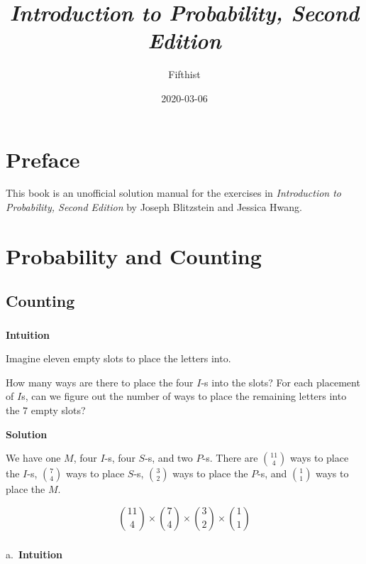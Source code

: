 \documentclass[]{book}
\title{\emph{Introduction to Probability, Second Edition}}
\author{Fifthist}
\date{2020-03-06}
\begin{document}
\maketitle

{
\setcounter{tocdepth}{1}
\tableofcontents
}
\chapter*{Preface}\label{preface}

This book is an unofficial solution manual for the exercises in
\emph{Introduction to Probability, Second Edition} by Joseph Blitzstein
and Jessica Hwang.

\chapter{Probability and Counting}\label{probability-and-counting}

\section{Counting}\label{counting}

\subsection{}\label{section}

\textbf{Intuition}

Imagine eleven empty slots to place the letters into.

How many ways are there to place the four \(I\)-s into the slots? For
each placement of \(I\)s, can we figure out the number of ways to place
the remaining letters into the \(7\) empty slots?

 \textbf{Solution}

We have one \(M\), four \(I\)-s, four \(S\)-s, and two \(P\)-s. There
are \({11 \choose 4}\) ways to place the \(I\)-s, \({7 \choose 4}\) ways
to place \(S\)-s, \({3 \choose 2}\) ways to place the \(P\)-s, and
\({1 \choose 1}\) ways to place the \(M\).

\[ {11 \choose 4} \times {7 \choose 4} \times {3 \choose 2} \times {1 \choose 1} \]

\subsection{}\label{section-1}

a.~\textbf{Intuition}
\end{document}
